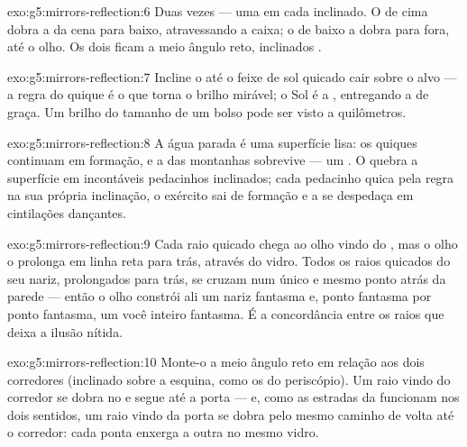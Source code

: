 \begin{solution}{exo:g5:mirrors-reflection:6}
Duas vezes --- uma em cada  inclinado. O  de cima dobra
a  da cena para baixo, atravessando a caixa; o de baixo a dobra
para fora, até o olho. Os dois ficam a meio ângulo reto, inclinados
.
\end{solution}

\begin{solution}{exo:g5:mirrors-reflection:7}
Incline o  até o feixe de sol quicado cair sobre o alvo --- a
regra do quique é o que torna o brilho mirável; o Sol é a , entregando a  de graça. Um brilho do tamanho de um bolso
pode ser visto a quilômetros.
\end{solution}

\begin{solution}{exo:g5:mirrors-reflection:8}
A água parada é uma superfície lisa: os quiques continuam em
formação, e a  das montanhas sobrevive --- um . O 
quebra a superfície em incontáveis pedacinhos inclinados; cada
pedacinho quica pela regra na sua própria inclinação, o exército sai
de formação e a  se despedaça em cintilações dançantes.
\end{solution}

\begin{solution}{exo:g5:mirrors-reflection:9}
Cada raio quicado chega ao olho vindo do , mas o olho o
prolonga em linha reta para trás, através do vidro. Todos os raios
quicados do seu nariz, prolongados para trás, se cruzam num único e
mesmo ponto atrás da parede --- então o olho constrói ali um nariz
fantasma e, ponto fantasma por ponto fantasma, um você inteiro
fantasma. É a concordância entre os raios que deixa a ilusão nítida.
\end{solution}

\begin{solution}{exo:g5:mirrors-reflection:10}
Monte-o a meio ângulo reto em relação aos dois corredores (inclinado
sobre a esquina, como os  do periscópio). Um raio vindo do
corredor se dobra no  e segue até a porta --- e, como as
estradas da  funcionam nos dois sentidos, um raio vindo da porta
se dobra pelo mesmo caminho de volta até o corredor: cada ponta
enxerga a outra no mesmo vidro.
\end{solution}

